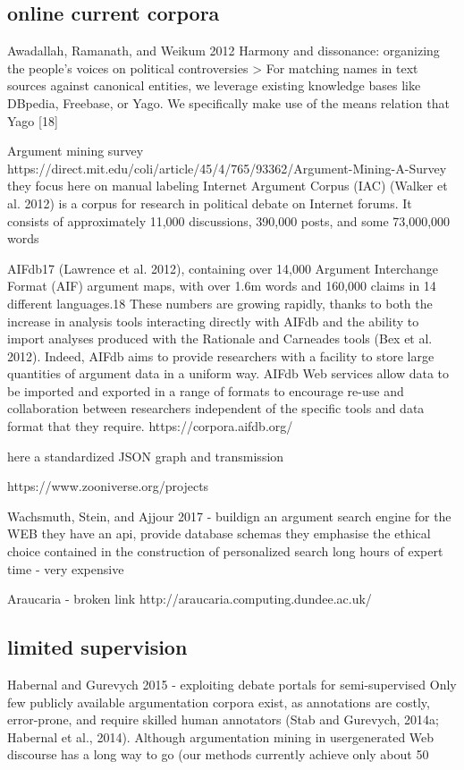 \documentclass{article}
\begin{document}
\subsection{online current corpora}

Awadallah, Ramanath, and Weikum 2012 Harmony and dissonance: organizing the people's voices on political controversies
> For matching names in text sources against canonical entities, we leverage existing knowledge bases like DBpedia, Freebase, or Yago. We specifically make use of the means relation that Yago [18]

Argument mining survey
https://direct.mit.edu/coli/article/45/4/765/93362/Argument-Mining-A-Survey
they focus here on manual labeling
Internet Argument Corpus (IAC) (Walker et al. 2012) is a corpus for research
in political debate on Internet forums. It consists of approximately 11,000 discussions, 390,000 posts, and some 73,000,000 words

AIFdb17 (Lawrence et al. 2012), containing over 14,000 Argument Interchange Format (AIF) argument maps, with over 1.6m words and 160,000 claims in 14 different languages.18 These numbers are growing rapidly, thanks to both the increase in analysis tools interacting directly with AIFdb and the ability to import analyses produced with the Rationale and Carneades tools (Bex et al. 2012). Indeed, AIFdb aims to provide researchers with a facility to store large quantities of argument data in a uniform way. AIFdb Web services allow data to be imported and exported in a range of formats to encourage re-use and collaboration between researchers independent of the specific tools and data format that they require.
https://corpora.aifdb.org/

here a standardized JSON graph and transmission

https://www.zooniverse.org/projects

Wachsmuth, Stein, and Ajjour 2017 - buildign an argument search engine for the WEB
they have an api, provide database schemas
they emphasise the ethical choice contained in the construction of personalized search
long hours of expert time - very expensive

Araucaria - broken link
http://araucaria.computing.dundee.ac.uk/

\subsection{limited supervision}
Habernal and Gurevych 2015 - exploiting debate portals for semi-supervised
Only few publicly available argumentation corpora exist, as annotations are costly, error-prone, and require skilled human annotators (Stab and Gurevych, 2014a; Habernal et al., 2014).
Although argumentation mining in usergenerated Web discourse has a long way to go (our methods currently achieve only about 50%
\end{document}
